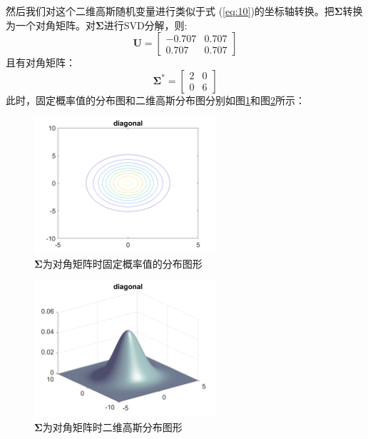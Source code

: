 \documentclass[10pt,a4paper,UTF8]{article}
\begin{document}
然后我们对这个二维高斯随机变量进行类似于式 (\ref{eq:10})的坐标轴转换。把\(\mathbf{\Sigma}\)转换为一个对角矩阵。对\(\mathbf{\Sigma}\)进行SVD分解，则:
\begin{equation}
\label{eq:27}
\mathbf{U} =
\begin{bmatrix}
-0.707 & 0.707 \\
0.707 & 0.707
\end{bmatrix}
\end{equation}
且有对角矩阵：
\begin{equation}
\label{eq:28}
\mathbf{\Sigma}^{*} =
\begin{bmatrix}
2 & 0 \\
0 & 6
\end{bmatrix}
\end{equation}
此时，固定概率值的分布图和二维高斯分布图分别如图\ref{fig:org5414b16}和图\ref{fig:org773f2a2}所示：
\begin{figure}[htbp]
\centering
\includegraphics[width=0.6\textwidth]{../../img/computer_prml/20170625figure2dgaussdiagnal.png}
\caption{\label{fig:org5414b16}
\(\mathbf{\Sigma}\)为对角矩阵时固定概率值的分布图形}
\end{figure}

\begin{figure}[htbp]
\centering
\includegraphics[width=0.6\textwidth]{../../img/computer_prml/20170625figure2dgaussdiagnalsurface.png}
\caption{\label{fig:org773f2a2}
\(\mathbf{\Sigma}\)为对角矩阵时二维高斯分布图形}
\end{figure}
\end{document}
